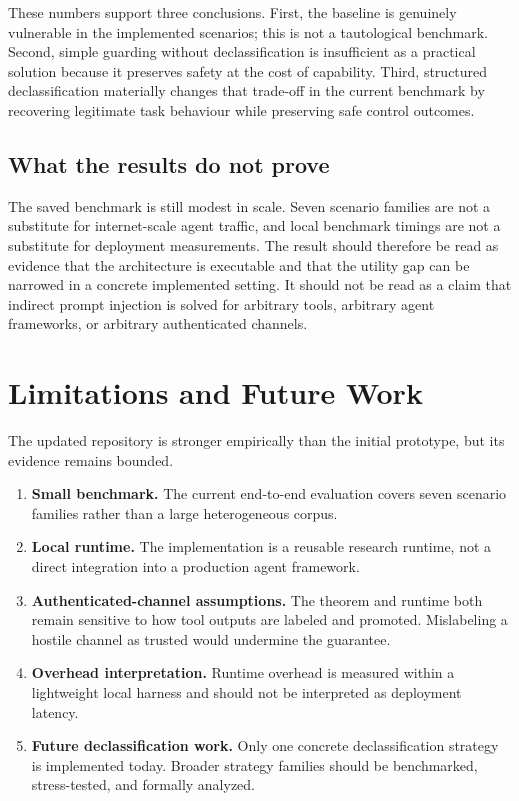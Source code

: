\documentclass[11pt]{article}
\begin{document}
These numbers support three conclusions. First, the baseline is genuinely
vulnerable in the implemented scenarios; this is not a tautological benchmark.
Second, simple guarding without declassification is insufficient as a practical
solution because it preserves safety at the cost of capability. Third,
structured declassification materially changes that trade-off in the current
benchmark by recovering legitimate task behaviour while preserving safe control
outcomes.

\subsection{What the results do not prove}

The saved benchmark is still modest in scale. Seven scenario families are not a
substitute for internet-scale agent traffic, and local benchmark timings are
not a substitute for deployment measurements. The result should therefore be
read as evidence that the architecture is executable and that the utility gap
can be narrowed in a concrete implemented setting. It should not be read as a
claim that indirect prompt injection is solved for arbitrary tools, arbitrary
agent frameworks, or arbitrary authenticated channels.

\section{Limitations and Future Work}
\label{sec:limitations}

The updated repository is stronger empirically than the initial prototype, but
its evidence remains bounded.

\begin{enumerate}[label=(\arabic*)]
  \item \textbf{Small benchmark.} The current end-to-end evaluation covers
        seven scenario families rather than a large heterogeneous corpus.
  \item \textbf{Local runtime.} The implementation is a reusable research
        runtime, not a direct integration into a production agent framework.
  \item \textbf{Authenticated-channel assumptions.} The theorem and runtime
        both remain sensitive to how tool outputs are labeled and promoted.
        Mislabeling a hostile channel as trusted would undermine the guarantee.
  \item \textbf{Overhead interpretation.} Runtime overhead is measured within a
        lightweight local harness and should not be interpreted as deployment
        latency.
  \item \textbf{Future declassification work.} Only one concrete
        declassification strategy is implemented today. Broader strategy
        families should be benchmarked, stress-tested, and formally analyzed.
\end{enumerate}
\end{document}
